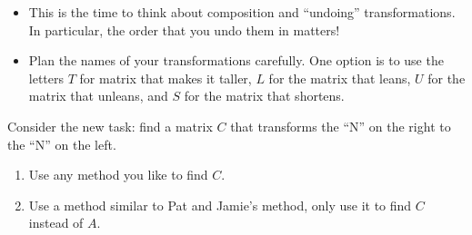 \documentclass{problemset}
\begin{document}
\begin{iola}
	\begin{annotation}
		\begin{notes}
			\begin{itemize}
				\item This is the time to think about composition and ``undoing'' 
					transformations. In particular, the order that you undo
					them in matters!
				\item Plan the names of your transformations carefully. One option is to use the letters
					$T$ for matrix that makes it taller, $L$ for the matrix that leans,
					$U$ for the matrix that unleans, and $S$ for the matrix that shortens.
			\end{itemize}
		\end{notes}
	\end{annotation}
Consider the new task: find a matrix $C$ that transforms the ``N'' on the right to
the ``N'' on the left.
\begin{enumerate}
	\item Use any method you like to find $C$.
	\item Use a method similar to Pat and Jamie's method, only use it to find $C$ instead
		of $A$.
\end{enumerate}
\end{iola}
\end{document}

